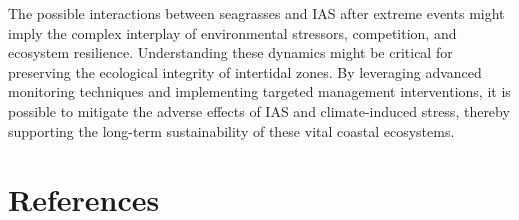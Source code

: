 \documentclass[
  letterpaper,
  11pt,
  english,
  singlespacing,
  headsepline]{MastersDoctoralThesis}
\newcommand{\chaptertopimage}{Chapter1/img/seagrasses.png}
\newcommand{\chapterbottomimage}{Chapter1/img/seagrasses.png}
\begin{document}
\begin{spacing}{1.5}
The possible interactions between seagrasses and IAS after extreme
events might imply the complex interplay of environmental stressors,
competition, and ecosystem resilience. Understanding these dynamics
might be critical for preserving the ecological integrity of intertidal
zones. By leveraging advanced monitoring techniques and implementing
targeted management interventions, it is possible to mitigate the
adverse effects of IAS and climate-induced stress, thereby supporting
the long-term sustainability of these vital coastal ecosystems.

\end{spacing}

\renewcommand{\chaptertopimage}{Chapter2/img/ASD_psd.png}
\renewcommand{\chapterbottomimage}{Chapter2/img/Seagrass_quadrats_psd.png}

\newpage\null\thispagestyle{empty}\newpage


\chapter*{References}\label{references}


\begingroup
\raggedright
\end{document}
